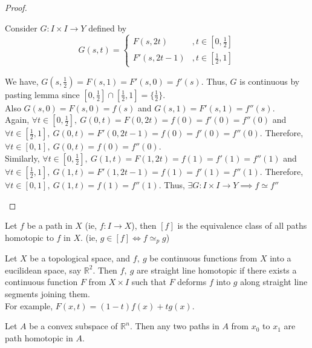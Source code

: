 \begin{proof}
\begin{enumerate}
			Consider $G:I \times I \to Y$ defined by \[ G(s,t) = \begin{cases} F(s,2t) & , t \in [0,\frac{1}{2}]\\ F'(s,2t-1) & , t \in [\frac{1}{2},1] \end{cases} \]
				
			We have, $G(s,\frac{1}{2}) = F(s,1) = F'(s,0) = f'(s)$. Thus, $G$ is continuous by pasting lemma since $[0,\frac{1}{2}] \cap [\frac{1}{2},1] = \{ \frac{1}{2}\}$.\\
			
			Also $G(s,0) = F(s,0) = f(s)$ and $G(s,1) = F'(s,1) = f''(s)$.\\

			Again, $\forall t \in [0,\frac{1}{2}],\ G(0,t) = F(0,2t) = f(0) = f'(0) = f''(0)$ and $\forall t \in [\frac{1}{2},1],\ G(0,t) = F'(0,2t-1) = f(0) = f'(0) = f''(0)$. Therefore, $\forall t \in [0,1],\ G(0,t) = f(0) = f''(0)$.\\
			
			Similarly, $\forall t \in [0,\frac{1}{2}],\ G(1,t) = F(1,2t) = f(1) = f'(1) = f''(1)$ and $\forall t \in [\frac{1}{2},1],\ G(1,t) = F'(1,2t-1) = f(1) = f'(1) = f''(1)$. Therefore, $\forall t \in [0,1],\ G(1,t) = f(1) = f''(1)$. Thus, $\exists G : I \times I \to Y \implies f \simeq f''$
	\end{enumerate}
\end{proof}

\begin{remark}
	Let $f$ be a path in $X$ (ie, $f : I \to X$), then $[f]$ is the equivalence class of all paths homotopic to $f$ in $X$. (ie, $g \in [f] \iff f \simeq_p g$)
\end{remark}

\begin{remark}
	Let $X$ be a topological space, and $f,\ g$ be continuous functions from $X$ into a eucilidean space, say $\mathbb{R}^2$. Then $f,\ g$ are straight line homotopic if there exists a continuous function $F$ from $X \times I$ such that $F$ deforms $f$ into $g$ along straight line segments joining them.\\

	For example, $F(x,t) = (1-t)f(x)+tg(x)$.
\end{remark}
\begin{remark}
	Let $A$ be a convex subspace of $\mathbb{R}^n$. Then any two paths in $A$ from $x_0$ to $x_1$ are path homotopic in $A$.
\end{remark}

